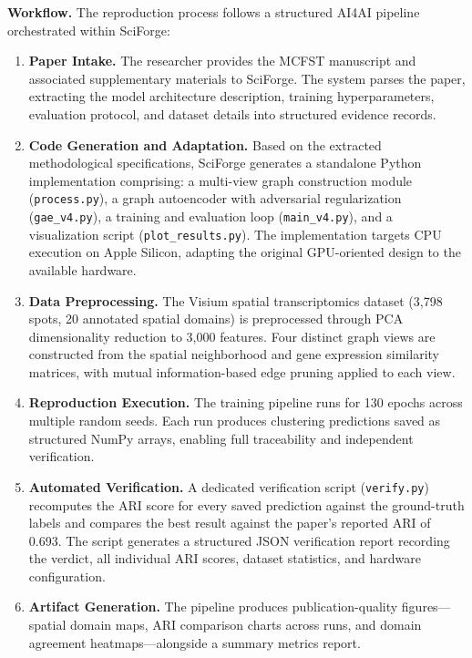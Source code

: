 \documentclass[sn-basic,Numbered,pdflatex]{sn-jnl}
\begin{document}
\textbf{Workflow.} The reproduction process follows a structured AI4AI pipeline orchestrated within SciForge:
\begin{enumerate}
    \item \textbf{Paper Intake.} The researcher provides the MCFST manuscript and associated supplementary materials to SciForge. The system parses the paper, extracting the model architecture description, training hyperparameters, evaluation protocol, and dataset details into structured evidence records.
    \item \textbf{Code Generation and Adaptation.} Based on the extracted methodological specifications, SciForge generates a standalone Python implementation comprising: a multi-view graph construction module (\texttt{process.py}), a graph autoencoder with adversarial regularization (\texttt{gae\_v4.py}), a training and evaluation loop (\texttt{main\_v4.py}), and a visualization script (\texttt{plot\_results.py}). The implementation targets CPU execution on Apple Silicon, adapting the original GPU-oriented design to the available hardware.
    \item \textbf{Data Preprocessing.} The Visium spatial transcriptomics dataset (3,798 spots, 20 annotated spatial domains) \cite{xu2024sedr} is preprocessed through PCA dimensionality reduction to 3,000 features. Four distinct graph views are constructed from the spatial neighborhood and gene expression similarity matrices, with mutual information-based edge pruning applied to each view.
    \item \textbf{Reproduction Execution.} The training pipeline runs for 130 epochs across multiple random seeds. Each run produces clustering predictions saved as structured NumPy arrays, enabling full traceability and independent verification.
    \item \textbf{Automated Verification.} A dedicated verification script (\texttt{verify.py}) recomputes the ARI score for every saved prediction against the ground-truth labels and compares the best result against the paper's reported ARI of 0.693. The script generates a structured JSON verification report recording the verdict, all individual ARI scores, dataset statistics, and hardware configuration.
    \item \textbf{Artifact Generation.} The pipeline produces publication-quality figures---spatial domain maps, ARI comparison charts across runs, and domain agreement heatmaps---alongside a summary metrics report.
\end{enumerate}
\end{document}

